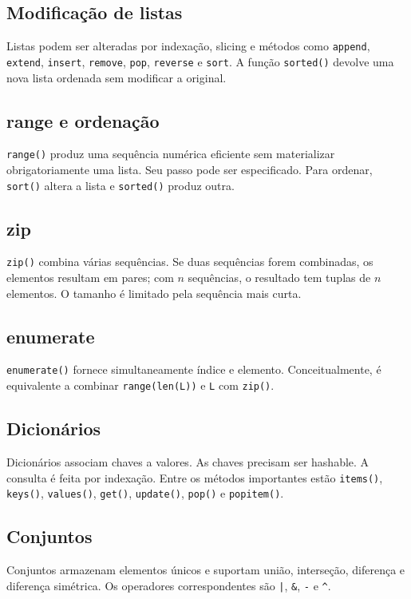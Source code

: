 \documentclass[11pt,a4paper]{article}
\begin{document}
\subsection{Modificação de listas}
Listas podem ser alteradas por indexação, slicing e métodos como \texttt{append}, \texttt{extend}, \texttt{insert}, \texttt{remove}, \texttt{pop}, \texttt{reverse} e \texttt{sort}. A função \texttt{sorted()} devolve uma nova lista ordenada sem modificar a original.

\subsection{range e ordenação}
\texttt{range()} produz uma sequência numérica eficiente sem materializar obrigatoriamente uma lista. Seu passo pode ser especificado. Para ordenar, \texttt{sort()} altera a lista e \texttt{sorted()} produz outra.

\subsection{zip}
\texttt{zip()} combina várias sequências. Se duas sequências forem combinadas, os elementos resultam em pares; com \(n\) sequências, o resultado tem tuplas de \(n\) elementos. O tamanho é limitado pela sequência mais curta.

\subsection{enumerate}
\texttt{enumerate()} fornece simultaneamente índice e elemento. Conceitualmente, é equivalente a combinar \texttt{range(len(L))} e \texttt{L} com \texttt{zip()}.

\subsection{Dicionários}
Dicionários associam chaves a valores. As chaves precisam ser hashable. A consulta é feita por indexação. Entre os métodos importantes estão \texttt{items()}, \texttt{keys()}, \texttt{values()}, \texttt{get()}, \texttt{update()}, \texttt{pop()} e \texttt{popitem()}.

\subsection{Conjuntos}
Conjuntos armazenam elementos únicos e suportam união, interseção, diferença e diferença simétrica. Os operadores correspondentes são \texttt{|}, \texttt{\&}, \texttt{-} e \texttt{\string^}.
\end{document}

